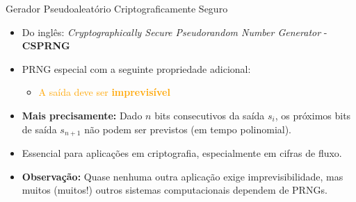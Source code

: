 \documentclass{beamer}
\begin{document}

\begin{frame}{Gerador Pseudoaleatório Criptograficamente Seguro}

\begin{itemize}
    \item Do inglês: \textit{Cryptographically Secure Pseudorandom Number Generator} - \textbf{CSPRNG}
    \item PRNG especial com a seguinte propriedade adicional:
    \begin{itemize}
        \item \textcolor{orange}{A saída deve ser \textbf{imprevisível}}
    \end{itemize}

    \item \textbf{Mais precisamente:} Dado $n$ bits consecutivos da saída $s_i$, os próximos bits de saída $s_{n+1}$ não podem ser previstos (em tempo polinomial).

    \item Essencial para aplicações em criptografia, especialmente em cifras de fluxo.

    \item \textbf{Observação:} Quase nenhuma outra aplicação exige imprevisibilidade, mas muitos (muitos!) outros sistemas computacionais dependem de PRNGs.
\end{itemize}

\end{frame}


\end{document}
